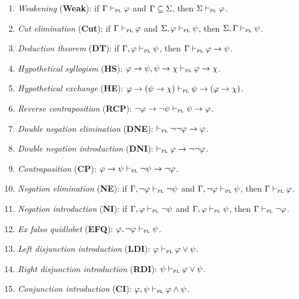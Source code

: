 \documentclass[a4paper, 11pt]{article} %
\begin{document}
\begin{enumerate}[itemsep=2pt]\small
  \item \textit{Weakening} (\textbf{Weak}): if $\Gamma \vdash_{\textsc{pl}} \varphi$ and $\Gamma \subseteq \Sigma$, then $\Sigma \vdash_{\textsc{pl}} \varphi$.
  \item \textit{Cut elimination} (\textbf{Cut}): if $\Gamma \vdash_{\textsc{pl}} \varphi$ and $\Sigma, \varphi \vdash_{\textsc{pl}} \psi$, then $\Sigma,\Gamma \vdash_{\textsc{pl}} \psi$.
  \item \textit{Deduction theorem} (\textbf{DT}): if $\Gamma, \varphi \vdash_{\textsc{pl}} \psi$, then $\Gamma \vdash_{\textsc{pl}} \varphi \rightarrow \psi$.
  \item \textit{Hypothetical syllogism} (\textbf{HS}): $\varphi \rightarrow \psi, \psi \rightarrow \chi \vdash_{\textsc{pl}} \varphi \rightarrow \chi$.
  \item \textit{Hypothetical exchange} (\textbf{HE}): $\varphi \rightarrow (\psi \rightarrow \chi) \vdash_{\textsc{pl}} \psi \rightarrow (\varphi \rightarrow \chi)$.
  \item \textit{Reverse contraposition} (\textbf{RCP}): $\neg\varphi \rightarrow \neg\psi \vdash_{\textsc{pl}} \psi \rightarrow \varphi$.
  \item \textit{Double negation elimination} (\textbf{DNE}): $\vdash_{\textsc{pl}} \neg\neg\varphi \rightarrow \varphi$.
  \item \textit{Double negation introduction} (\textbf{DNI}): $\vdash_{\textsc{pl}} \varphi \rightarrow \neg\neg\varphi$.
  \item \textit{Contraposition} (\textbf{CP}): $\varphi \rightarrow \psi \vdash_{\textsc{pl}} \neg\psi \rightarrow \neg\varphi$.
  \item \textit{Negation elimination} (\textbf{NE}): if $\Gamma, \neg\varphi \vdash_{\textsc{pl}} \neg\psi$ and $\Gamma, \neg\varphi \vdash_{\textsc{pl}} \psi$, then $\Gamma \vdash_{\textsc{pl}} \varphi$. 
  \item \textit{Negation introduction} (\textbf{NI}): if $\Gamma, \varphi \vdash_{\textsc{pl}} \neg\psi$ and $\Gamma, \varphi \vdash_{\textsc{pl}} \psi$, then $\Gamma \vdash_{\textsc{pl}} \neg\varphi$. 
  \item \textit{Ex falso quidlobet} (\textbf{EFQ}): $\varphi, \neg\varphi \vdash_{\textsc{pl}} \psi$. 
  \item \textit{Left disjunction introduction} (\textbf{LDI}): $\varphi \vdash_{\textsc{pl}} \varphi \vee \psi$. 
  \item \textit{Right disjunction introduction} (\textbf{RDI}): $\psi \vdash_{\textsc{pl}} \varphi \vee \psi$. 
  \item \textit{Conjunction introduction} (\textbf{CI}): $\varphi, \psi \vdash_{\textsc{pl}} \varphi \wedge \psi$. 

\end{enumerate}
\end{document}
